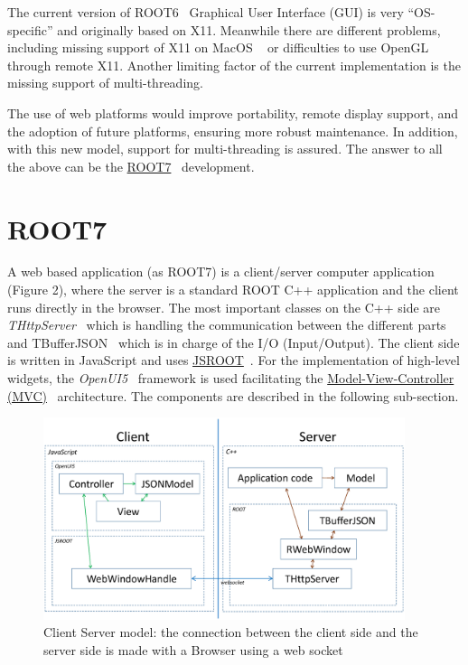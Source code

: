 \documentclass[a4paper]{jpconf}
\begin{document}
The current version of ROOT6~\cite{root6} Graphical User Interface (GUI) is very ``OS-specific'' and originally based on X11.
Meanwhile there are different problems, including missing support of X11 on MacOS ~\cite{x11} or difficulties to use OpenGL through remote X11.
Another limiting factor of the current implementation is the missing support of multi-threading.

The use of web platforms would improve portability, remote display support, and the adoption of future platforms, ensuring more robust maintenance. In addition, with this new model, support for multi-threading is assured.
The answer to all the above can be the \href{https://root.cern/root-7}{ROOT7}~\cite{root7} development.

\section{ROOT7}

A web based application (as ROOT7) is a client/server computer application (Figure 2),
where the server is a standard ROOT C++ application and the client runs directly in the browser.
The most important classes on the C++ side are {\it THttpServer}~\cite{http} which is handling
the communication between the different parts and TBufferJSON~\cite{buffer}
which is in charge of the I/O (Input/Output). The client side is written in JavaScript and uses \href{https://root.cern/js/}{JSROOT}~\cite{jsroot}.
For the implementation of high-level widgets, the \textit{OpenUI5}~\cite{openui} framework is used facilitating the
\href{https://en.wikipedia.org/wiki/Model%E2%80%93view%E2%80%93controller}{Model-View-Controller (MVC)}~\cite{mvc}
architecture. The components are described in the following sub-section.

\begin{figure}[h]
  \begin{center}
    \includegraphics[width=25pc]{figure2.eps}\hspace{2pc}%
  \end{center}
  \centering
\begin{minipage}[b]{20pc}\caption{\label{label}Client Server model: the connection between the client side and the server side is made with a Browser using a web socket}
\end{minipage}
\end{figure}
\end{document}
